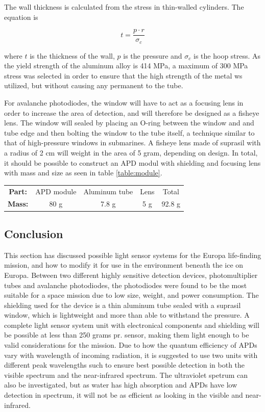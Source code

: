 The wall thickness is calculated from the stress in thin-walled cylinders. The equation is 

\begin{equation}
    t = \frac{p \cdot r}{\sigma _c}
\end{equation}

where $t$ is the thickness of the wall, $p$ is the pressure and $\sigma _c$ is the hoop stress. As the yield strength of the aluminum alloy is 414 MPa, a maximum of 300 MPa stress was selected in order to ensure that the high strength of the metal ws utilized, but without causing any permanent to the tube. 

For avalanche photodiodes, the window will have to act as a focusing lens in order to increase the area of detection, and will therefore be designed as a fisheye lens. The window will sealed by placing an O-ring between the window and and tube edge and then bolting the window to the tube itself, a technique similar to that of high-pressure windows in submarines. A fisheye lens made of suprasil with a radius of 2 cm will weight in the area of 5 gram, depending on design. In total, it should be possible to construct an APD modul with shielding and focusing lens with mass and size as seen in table \ref{table:module}. 

\begin{center}
\label{table:module}
\begin{tabular}{|c|c|c|c|c|}
 \hline
               
 \textbf{Part:} & APD module & Aluminum tube & Lens & Total \\ 
 \textbf{Mass:} & 80 g & 7.8 g & 5 g & 92.8 g  \\ 
 \hline
\end{tabular}
\end{center}

\subsection{Conclusion}

This section has discussed possible light sensor systems for the Europa life-finding mission, and how to modify it for use in the environment beneath the ice on Europa. Between two different highly sensitive detection devices, photomultiplier tubes and avalanche photodiodes, the photodiodes were found to be the most suitable for a space mission due to low size, weight, and power consumption. The shielding used for the device is a thin aluminum tube sealed with a suprasil window, which is lightweight and more than able to withstand the pressure. A complete light sensor system unit with electronical components and shielding will be possible at less than 250 grams pr. sensor, making them light enough to be valid considerations for the mission. Due to how the quantum efficiency of APDs vary with wavelength of incoming radiation, it is suggested to use two units with different peak wavelengths such to ensure best possible detection in both the visible spectrum and the near-infrared spectrum. The ultraviolet spetrum can also be investigated, but as water has high absorption and APDs have low detection in spectrum, it will not be as efficient as looking in the visible and near-infrared.

